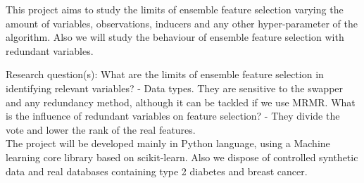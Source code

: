 This project aims to study the limits of ensemble feature selection varying the amount of variables, observations, inducers and any other hyper-parameter of the algorithm. Also we will study the behaviour of ensemble feature selection with redundant variables.

Research question(s):
What are the limits of ensemble feature selection in identifying relevant variables?
- Data types. They are sensitive to the swapper and any redundancy method, although it can be tackled if we use MRMR.
What is the influence of redundant variables on feature selection?
- They divide the vote and lower the rank of the real features.
\\

The project will be developed mainly in Python language, using a Machine learning core library based on scikit-learn. Also we dispose of controlled synthetic data and real databases containing type 2 diabetes and breast cancer.
